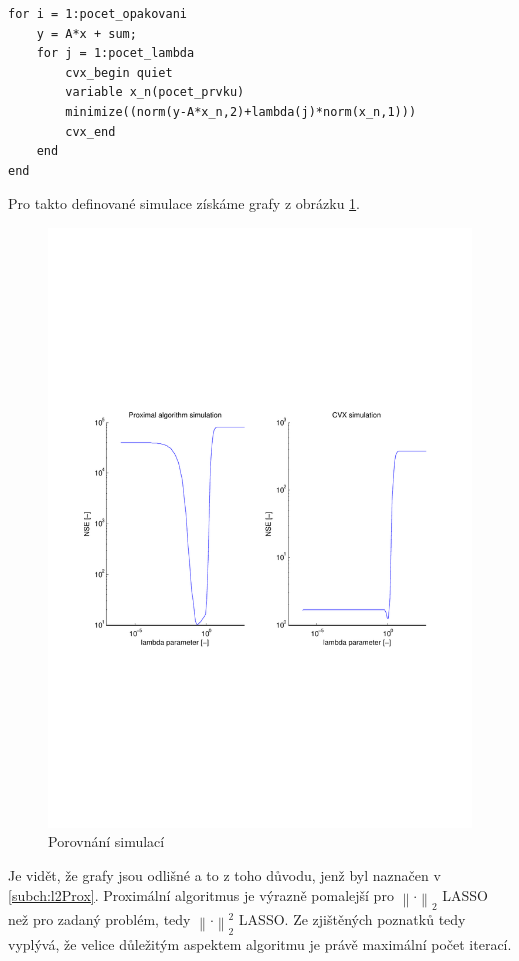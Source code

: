 \documentclass[FM,BP]{tulthesis}
\begin{document}
\begin{lstlisting}
for i = 1:pocet_opakovani
	y = A*x + sum;
	for j = 1:pocet_lambda
		cvx_begin quiet
		variable x_n(pocet_prvku)
		minimize((norm(y-A*x_n,2)+lambda(j)*norm(x_n,1)))
		cvx_end
	end
end
\end{lstlisting}
Pro takto definované simulace získáme grafy z obrázku \ref{fig:sims}.

\begin{figure}[!ht]
	\begin{center}
		\includegraphics[scale=0.7]{obr/sims.pdf}
	\end{center}
	\caption{Porovnání simulací}
	\label{fig:sims}
\end{figure}

Je vidět, že grafy jsou odlišné a to z toho důvodu, jenž byl naznačen v \ref{subch:l2Prox}. Proximální algoritmus je výrazně pomalejší pro $\left\| \cdot \right\| _{2}$ LASSO než pro zadaný problém, tedy $\left\| \cdot \right\|_{2}^{2} $ LASSO. Ze zjištěných poznatků tedy vyplývá, že velice důležitým aspektem algoritmu je právě maximální počet iterací. 
\end{document}
